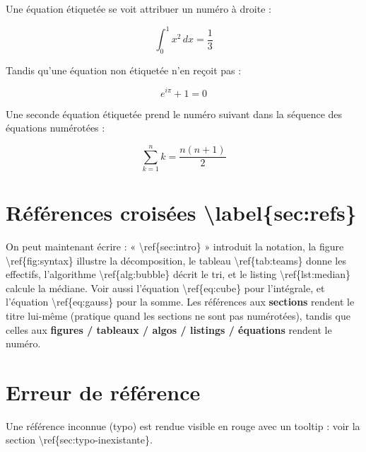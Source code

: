 \documentclass[11pt,a4paper]{article}
\theoremstyle{definition}
\begin{document}
Une équation étiquetée se voit attribuer un numéro à droite :


\[
\int_0^1 x^2 \, dx = \frac{1}{3} \label{eq:cube}
\]


Tandis qu'une équation non étiquetée n'en reçoit pas :


\[
e^{i\pi} + 1 = 0
\]


Une seconde équation étiquetée prend le numéro suivant dans la
séquence des équations numérotées :


\[
\sum_{k=1}^n k = \frac{n(n+1)}{2} \label{eq:gauss}
\]


\section{Références croisées \textbackslash{}label\{sec:refs\}}

On peut maintenant écrire : « \textbackslash{}ref\{sec:intro\} » introduit la
notation, la figure \textbackslash{}ref\{fig:syntax\} illustre la décomposition,
le tableau \textbackslash{}ref\{tab:teams\} donne les effectifs, l'algorithme
\textbackslash{}ref\{alg:bubble\} décrit le tri, et le listing \textbackslash{}ref\{lst:median\}
calcule la médiane. Voir aussi l'équation \textbackslash{}ref\{eq:cube\} pour
l'intégrale, et l'équation \textbackslash{}ref\{eq:gauss\} pour la somme. Les
références aux \textbf{sections} rendent le titre lui-même (pratique
quand les sections ne sont pas numérotées), tandis que celles aux
\textbf{figures / tableaux / algos / listings / équations} rendent le
numéro.


\section{Erreur de référence}

Une référence inconnue (typo) est rendue visible en rouge avec
un tooltip : voir la section \textbackslash{}ref\{sec:typo-inexistante\}.
\end{document}
